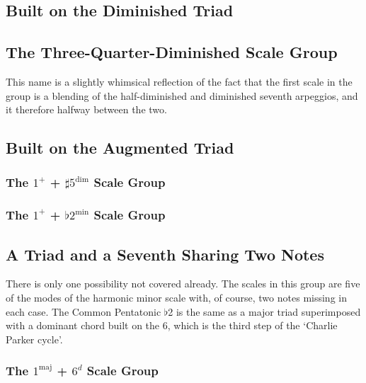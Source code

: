 \documentclass[english]{./gbook}
\begin{document}
\begin{large}
\subsection{Built on the Diminished Triad}

\subsection{The Three-Quarter-Diminished Scale Group}
This name is a slightly whimsical reflection of the fact that the first scale in the group is a blending of the half-diminished and diminished seventh arpeggios, and it therefore halfway between the two.

\subsection{Built on the Augmented Triad}

\subsubsection{The $1^+$ + $\sharp 5^{\text{dim}}$ Scale Group}

\subsubsection{The $1^+$ + $\flat 2^{\text{min}}$ Scale Group}


\subsection{A Triad and a Seventh Sharing Two Notes}

There is only one possibility not covered already. The scales in this group are five of the modes of the harmonic minor scale with, of course, two notes missing in each case. The Common Pentatonic $\flat$2 is the same as a major triad superimposed with a dominant chord built on the 6, which is the third step of the `Charlie Parker cycle'.

\subsubsection{The $1^{\text{maj}}$ + $6^d$ Scale Group}



\end{large}
\end{document}
